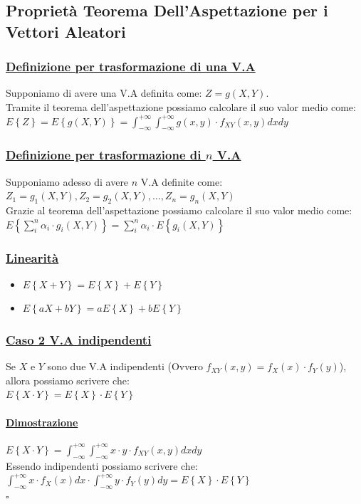 \documentclass{article}
\begin{document}
\subsection{Proprietà Teorema Dell’Aspettazione per i Vettori Aleatori}
\subsubsection{\underline{Definizione per trasformazione di una V.A}}
Supponiamo di avere una V.A definita come: $Z = g(X,Y)$. \\
Tramite il teorema dell'aspettazione possiamo calcolare il suo valor medio come:\\
$E\left\{ Z \right\} = E\left\{ g(X,Y) \right\} = \int_{-\infty}^{+\infty} \int_{-\infty}^{+\infty} g(x,y) \cdot f_{XY}(x,y) dx dy$
\subsubsection{\underline{Definizione per trasformazione di $n$ V.A}}
Supponiamo adesso di avere $n$ V.A definite come: $Z_1 = g_1(X,Y), Z_2 = g_2(X,Y), \dots, Z_n = g_n(X,Y)$ \\
Grazie al teorema dell'aspettazione possiamo calcolare il suo valor medio come: \\
$E\left\{ \sum_i^n \alpha_i \cdot g_i(X,Y) \right\} = \sum_i^n \alpha_i \cdot E\left\{ g_i(X,Y) \right\}$
\subsubsection{\underline{Linearità}}
\begin{itemize}
    \item $E\left\{ X+Y \right\} = E\left\{ X \right\} + E\left\{ Y \right\}$
    \item $E\left\{ aX + bY \right\} = aE\left\{ X \right\} + bE\left\{ Y \right\}$
\end{itemize}
\subsubsection{\underline{Caso 2 V.A indipendenti}}
Se $X$ e $Y$ sono due V.A indipendenti (Ovvero $f_{XY}(x,y) = f_X(x) \cdot f_Y(y)$), allora possiamo scrivere che: \\
$E\left\{ X \cdot Y \right\} = E\left\{ X \right\} \cdot E\left\{ Y \right\}$
\paragraph{\underline{Dimostrazione}}
$E\left\{ X \cdot Y \right\} = \int_{-\infty}^{+\infty} \int_{-\infty}^{+\infty} x \cdot y \cdot f_{XY}(x,y) dx dy$ \\
Essendo indipendenti possiamo scrivere che: \\
$\int_{-\infty}^{+\infty} x \cdot f_X(x) dx \cdot \int_{-\infty}^{+\infty} y \cdot f_Y(y) dy = E\left\{ X \right\} \cdot E\left\{ Y \right\}$ \\
\hspace*{0pt}\hfill $\square$
\end{document}
